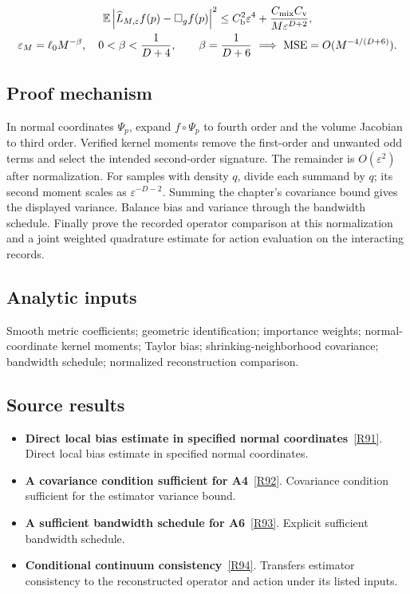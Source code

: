 \documentclass[11pt,a4paper]{article}
\begin{document}
\begin{gather*}
\mathbb E\left|\widehat L_{M,\varepsilon}f(p)-\Box_gf(p)\right|^2
\le C_{\rm b}^2\varepsilon^4+
\frac{C_{\rm mix}C_{\rm v}}{M\varepsilon^{D+2}},\\
\varepsilon_M=\ell_0M^{-\beta},\quad 0<\beta<\frac1{D+4},\qquad
\beta=\frac1{D+6}\ \Longrightarrow\ \mathrm{MSE}=O(M^{-4/(D+6)}).
\end{gather*}
\subsection*{Proof mechanism}
In normal coordinates \(\Psi_p\), expand \(f\circ\Psi_p\) to fourth order and the volume Jacobian to third order. Verified kernel moments remove the first-order and unwanted odd terms and select the intended second-order signature. The remainder is \(O(\varepsilon^2)\) after normalization. For samples with density \(q\), divide each summand by \(q\); its second moment scales as \(\varepsilon^{-D-2}\). Summing the chapter's covariance bound gives the displayed variance. Balance bias and variance through the bandwidth schedule. Finally prove the recorded operator comparison at this normalization and a joint weighted quadrature estimate for action evaluation on the interacting records.
\subsection*{Analytic inputs}
Smooth metric coefficients; geometric identification; importance weights; normal-coordinate kernel moments; Taylor bias; shrinking-neighborhood covariance; bandwidth schedule; normalized reconstruction comparison.
\subsection*{Source results}
\begin{itemize}
\item \textbf{Direct local bias estimate in specified normal coordinates}~\hyperref[src:lem-continuum-local-bias]{[R91]}. Direct local bias estimate in specified normal coordinates.
\item \textbf{A covariance condition sufficient for A4}~\hyperref[src:lem-continuum-a4-mixing]{[R92]}. Covariance condition sufficient for the estimator variance bound.
\item \textbf{A sufficient bandwidth schedule for A6}~\hyperref[src:lem-continuum-a6-scaling]{[R93]}. Explicit sufficient bandwidth schedule.
\item \textbf{Conditional continuum consistency}~\hyperref[src:cor-continuum-consistency-conditional]{[R94]}. Transfers estimator consistency to the reconstructed operator and action under its listed inputs.
\end{itemize}
\end{document}
